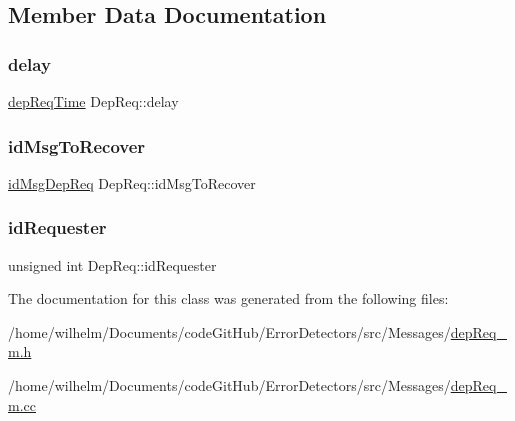 \subsection{Member Data Documentation}
\mbox{\label{class_dep_req_a5df5ddeac692e25c089b458faf51e0c9}} 
\subsubsection{\texorpdfstring{delay}{delay}}
{\footnotesize\ttfamily \hyperlink{dep_req__m_8h_ae16a4057335e3a89fda3f6019868733b}{dep\+Req\+Time} Dep\+Req\+::delay\hspace{0.3cm}{\ttfamily [protected]}}

\mbox{\label{class_dep_req_a8547e169d4670212c0b612924dda94cc}} 
\subsubsection{\texorpdfstring{id\+Msg\+To\+Recover}{idMsgToRecover}}
{\footnotesize\ttfamily \hyperlink{dep_req__m_8h_a2bbb71ed0e9660ec02d81471eafd9c29}{id\+Msg\+Dep\+Req} Dep\+Req\+::id\+Msg\+To\+Recover\hspace{0.3cm}{\ttfamily [protected]}}

\mbox{\label{class_dep_req_a26936e95ef3fae4753d2442318646c6b}} 
\subsubsection{\texorpdfstring{id\+Requester}{idRequester}}
{\footnotesize\ttfamily unsigned int Dep\+Req\+::id\+Requester\hspace{0.3cm}{\ttfamily [protected]}}



The documentation for this class was generated from the following files\+:\begin{DoxyCompactItemize}
\item 
/home/wilhelm/\+Documents/code\+Git\+Hub/\+Error\+Detectors/src/\+Messages/\hyperlink{dep_req__m_8h}{dep\+Req\+\_\+m.\+h}\item 
/home/wilhelm/\+Documents/code\+Git\+Hub/\+Error\+Detectors/src/\+Messages/\hyperlink{dep_req__m_8cc}{dep\+Req\+\_\+m.\+cc}\end{DoxyCompactItemize}
